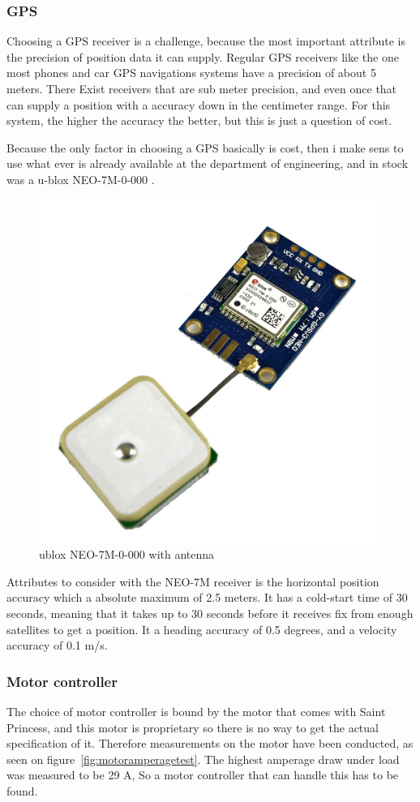 \subsubsection{GPS}
Choosing a GPS receiver is a challenge, because the most important attribute is the precision of position data it can supply. Regular GPS receivers like the one most phones and car GPS navigations systems have a precision of about 5 meters. There Exist receivers that are sub meter precision, and even once that can supply a position with a accuracy down in the centimeter range. 
For this system, the higher the accuracy the better, but this is just a question of cost. 

Because the only factor in choosing a GPS basically is cost, then i make sens to use what ever is already available at the department of engineering, and in stock was a u-blox NEO-7M-0-000 \cite{ublox-datasheet}. 
\begin{figure}[H]
\centering
\includegraphics[width=0.5\linewidth]{Images/Design/ublox}
\caption{ublox NEO-7M-0-000 with antenna\cite{ublox-image}}
\label{fig:ublox}
\end{figure}
Attributes to consider with the NEO-7M receiver is the horizontal position accuracy which a absolute maximum of 2.5 meters. It has a cold-start time of 30 seconds, meaning that it takes up to 30 seconds before it receives fix from enough satellites to get a position. It a heading accuracy of 0.5 degrees, and a velocity accuracy of 0.1 m/s. 

\subsubsection{Motor controller}
The choice of motor controller is bound by the motor that comes with Saint Princess, and this motor is proprietary so there is no way to get the actual specification of it. Therefore measurements on the motor have been conducted, as seen on figure~\ref{fig:motoramperagetest}. The highest amperage draw under load was measured to be 29 A, So a motor controller that can handle this has to be found.

